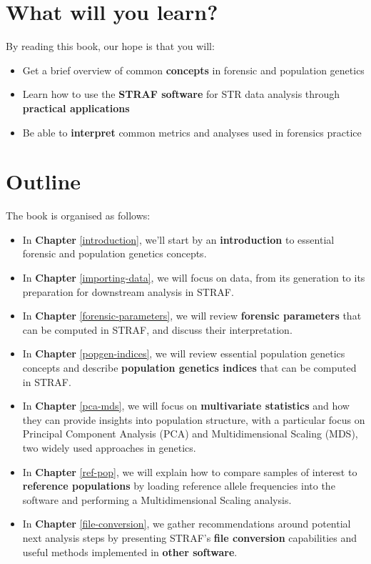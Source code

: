 \documentclass[
]{book}
\begin{document}
\hypertarget{what-will-you-learn}{%
\section*{What will you learn?}\label{what-will-you-learn}}

By reading this book, our hope is that you will:

\begin{itemize}
\item
  Get a brief overview of common \textbf{concepts} in forensic and population genetics
\item
  Learn how to use the \textbf{STRAF software} for STR data analysis through \textbf{practical applications}
\item
  Be able to \textbf{interpret} common metrics and analyses used in forensics practice
\end{itemize}

\hypertarget{outline}{%
\section*{Outline}\label{outline}}

The book is organised as follows:

\begin{itemize}
\item
  In \textbf{Chapter} \ref{introduction}, we'll start by an \textbf{introduction} to essential forensic and population genetics concepts.
\item
  In \textbf{Chapter} \ref{importing-data}, we will focus on data, from its generation to its preparation for
  downstream analysis in STRAF.
\item
  In \textbf{Chapter} \ref{forensic-parameters}, we will review \textbf{forensic parameters} that can be computed in STRAF,
  and discuss their interpretation.
\item
  In \textbf{Chapter} \ref{popgen-indices}, we will review essential population genetics concepts and
  describe \textbf{population genetics indices} that can be computed in STRAF.
\item
  In \textbf{Chapter} \ref{pca-mds}, we will focus on \textbf{multivariate statistics} and how they can provide
  insights into population structure, with a particular focus on Principal Component
  Analysis (PCA) and Multidimensional Scaling (MDS), two widely used approaches in genetics.
\item
  In \textbf{Chapter} \ref{ref-pop}, we will explain how to compare samples of interest to
  \textbf{reference populations} by loading reference allele frequencies into the
  software and performing a Multidimensional Scaling analysis.
\item
  In \textbf{Chapter} \ref{file-conversion}, we gather recommendations around potential next analysis steps
  by presenting STRAF's \textbf{file conversion} capabilities and useful methods implemented in
  \textbf{other software}.
\end{itemize}
\end{document}
